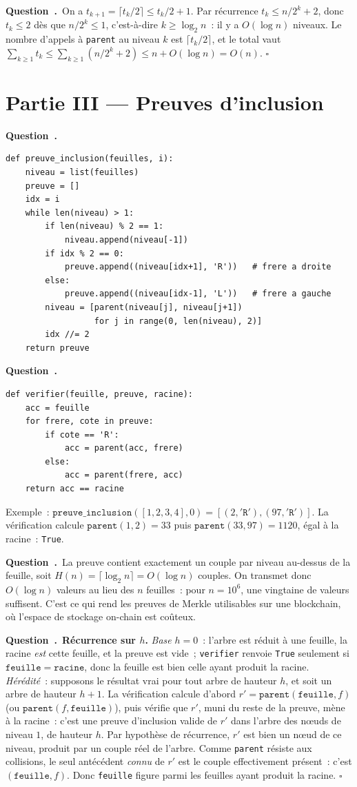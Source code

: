 \documentclass[11pt,a4paper]{article}
\newcounter{qcnt}
\newcommand{\Q}{\medskip\par\stepcounter{qcnt}\noindent\textbf{Question~\theqcnt.}~}
\newcommand{\code}[1]{\lstinline!#1!}
\begin{document}
\Q On a $t_{k+1}=\lceil t_k/2\rceil \le t_k/2 + 1$. Par récurrence $t_k \le n/2^{k} + 2$, donc
$t_k \le 2$ dès que $n/2^{k}\le 1$, c'est-à-dire $k \ge \log_2 n$~: il y a $O(\log n)$ niveaux. Le
nombre d'appels à \code{parent} au niveau $k$ est $\lceil t_k/2\rceil$, et le total vaut
$\sum_{k\ge 1} t_k \le \sum_{k\ge1}(n/2^k + 2) \le n + O(\log n) = O(n)$. $\square$

\section*{Partie III --- Preuves d'inclusion}

\Q
\begin{lstlisting}
def preuve_inclusion(feuilles, i):
    niveau = list(feuilles)
    preuve = []
    idx = i
    while len(niveau) > 1:
        if len(niveau) % 2 == 1:
            niveau.append(niveau[-1])
        if idx % 2 == 0:
            preuve.append((niveau[idx+1], 'R'))   # frere a droite
        else:
            preuve.append((niveau[idx-1], 'L'))   # frere a gauche
        niveau = [parent(niveau[j], niveau[j+1])
                  for j in range(0, len(niveau), 2)]
        idx //= 2
    return preuve
\end{lstlisting}

\Q
\begin{lstlisting}
def verifier(feuille, preuve, racine):
    acc = feuille
    for frere, cote in preuve:
        if cote == 'R':
            acc = parent(acc, frere)
        else:
            acc = parent(frere, acc)
    return acc == racine
\end{lstlisting}
Exemple~: $\mathtt{preuve\_inclusion}([1,2,3,4],0)=[(2,\mathtt{'R'}),(97,\mathtt{'R'})]$. La
vérification calcule $\mathtt{parent}(1,2)=33$ puis $\mathtt{parent}(33,97)=1120$, égal à la
racine~: \code{True}.

\Q La preuve contient exactement un couple par niveau au-dessus de la feuille, soit $H(n)=
\lceil\log_2 n\rceil = O(\log n)$ couples. On transmet donc $O(\log n)$ valeurs au lieu des $n$
feuilles~: pour $n=10^{6}$, une vingtaine de valeurs suffisent. C'est ce qui rend les preuves de
Merkle utilisables sur une blockchain, où l'espace de stockage on-chain est coûteux.

\Q \textbf{Récurrence sur $h$.} \emph{Base} $h=0$~: l'arbre est réduit à une feuille, la racine
\emph{est} cette feuille, et la preuve est vide~; \code{verifier} renvoie \code{True} seulement si
$\mathtt{feuille}=\mathtt{racine}$, donc la feuille est bien celle ayant produit la racine.
\emph{Hérédité}~: supposons le résultat vrai pour tout arbre de hauteur $h$, et soit un arbre de
hauteur $h+1$. La vérification calcule d'abord $r' = \mathtt{parent}(\mathtt{feuille},f)$ (ou
$\mathtt{parent}(f,\mathtt{feuille})$), puis vérifie que $r'$, muni du reste de la preuve, mène à
la racine~: c'est une preuve d'inclusion valide de $r'$ dans l'arbre des n\oe uds de niveau $1$,
de hauteur $h$. Par hypothèse de récurrence, $r'$ est bien un n\oe ud de ce niveau, produit par
un couple réel de l'arbre. Comme \code{parent} résiste aux collisions, le seul antécédent
\emph{connu} de $r'$ est le couple effectivement présent~: c'est $(\mathtt{feuille},f)$. Donc
\code{feuille} figure parmi les feuilles ayant produit la racine. $\square$
\end{document}
